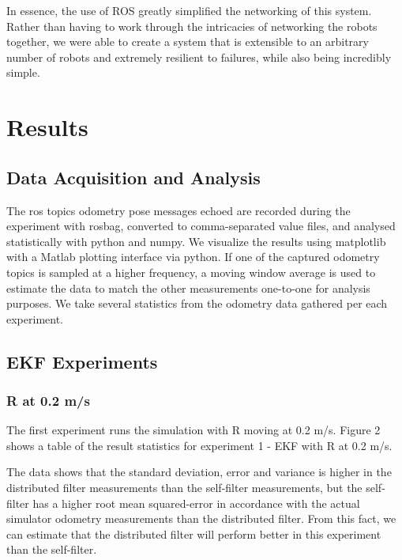 \documentclass[conference]{IEEEtran} \usepackage[T1]{fontenc} \usepackage[backend=biber, style=ieee]{biblatex}
\begin{document}
In essence, the use of ROS greatly simplified the networking of this system. Rather than having to work through the
intricacies of networking the robots together, we were able to create a system that is extensible to an arbitrary number
of robots and extremely resilient to failures, while also being incredibly simple.

\section{Results} \label{Results} %
\subsection{Data Acquisition and Analysis} \label{Data Acquisition and Analysis}
The ros topics odometry pose messages echoed are 
recorded during the experiment with rosbag, converted to comma-separated value files, and analysed statistically with 
python and numpy. We visualize the results using matplotlib with a Matlab plotting interface via python. If one of the 
captured odometry topics is sampled at a higher frequency, a moving window average is used to estimate the data to match 
the other measurements one-to-one for analysis purposes. We take several statistics from the odometry data gathered per each experiment. 

\subsection{EKF Experiments} \label{EKF Experiments}
\subsubsection{R at 0.2 m/s} \label{R at 0.2 m/s}
The first experiment runs the simulation with R moving at 0.2 m/s. Figure 2 shows a table of the result statistics for experiment 1 - EKF 
with R at 0.2 m/s. 


The data shows that the standard deviation, error and variance is higher in the distributed filter measurements than the 
self-filter measurements, but the self-filter has a higher root mean squared-error in accordance with the actual simulator odometry measurements than the distributed filter. From this fact, we can estimate that the distributed filter will perform better in this experiment than the self-filter. 
\end{document}
